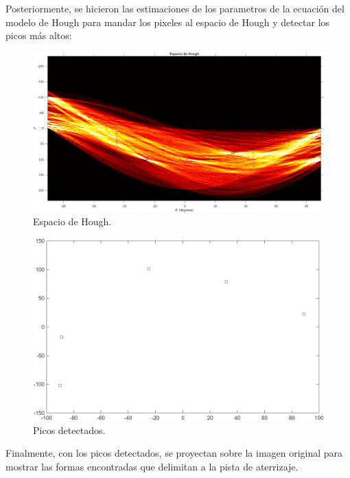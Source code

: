 \documentclass[11pt, letterpaper]{article}
\begin{document}
\newpage

Posteriormente, se hicieron las estimaciones de los parametros de la ecuación del modelo de Hough para mandar los pixeles al espacio de Hough y detectar los picos más altos:


\begin{figure}[h!]
	\centering
	\begin{minipage}{0.7\textwidth}
		\centering
		\includegraphics[width=\textwidth]{IMG/R3.png}
		\caption*{Espacio de Hough.}
	\end{minipage}\hfill
\end{figure}

\begin{figure}[h!]
	\centering
	\begin{minipage}{0.7\textwidth}
		\centering
		\includegraphics[width=\textwidth]{IMG/R4.png}
		\caption*{Picos detectados.}
	\end{minipage}\hfill
\end{figure}

\newpage

Finalmente, con los picos detectados, se proyectan sobre la imagen original para mostrar las formas encontradas que delimitan a la pista de aterrizaje.
\end{document}
